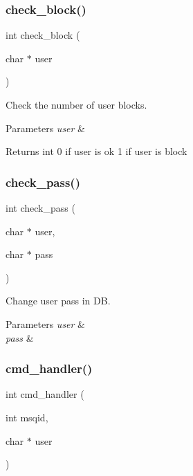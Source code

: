 \subsubsection{check\+\_\+block()}
{\footnotesize\ttfamily int check\+\_\+block (\begin{DoxyParamCaption}\item[{char $\ast$}]{user }\end{DoxyParamCaption})}



Check the number of user blocks. 


\begin{DoxyParams}{Parameters}
{\em user} & \\
\hline
\end{DoxyParams}
\begin{DoxyReturn}{Returns}
int 0 if user is ok 1 if user is block 
\end{DoxyReturn}
\mbox{\label{auth_8c_a3db4ab1fb0409a005f819caa6623865d}} 
\subsubsection{check\+\_\+pass()}
{\footnotesize\ttfamily int check\+\_\+pass (\begin{DoxyParamCaption}\item[{char $\ast$}]{user,  }\item[{char $\ast$}]{pass }\end{DoxyParamCaption})}



Change user pass in DB. 


\begin{DoxyParams}{Parameters}
{\em user} & \\
\hline
{\em pass} & \\
\hline
\end{DoxyParams}
\mbox{\label{auth_8c_a9aad4fc4e148f0c94e1c891951a824aa}} 
\subsubsection{cmd\+\_\+handler()}
{\footnotesize\ttfamily int cmd\+\_\+handler (\begin{DoxyParamCaption}\item[{int}]{msqid,  }\item[{char $\ast$}]{user }\end{DoxyParamCaption})}



